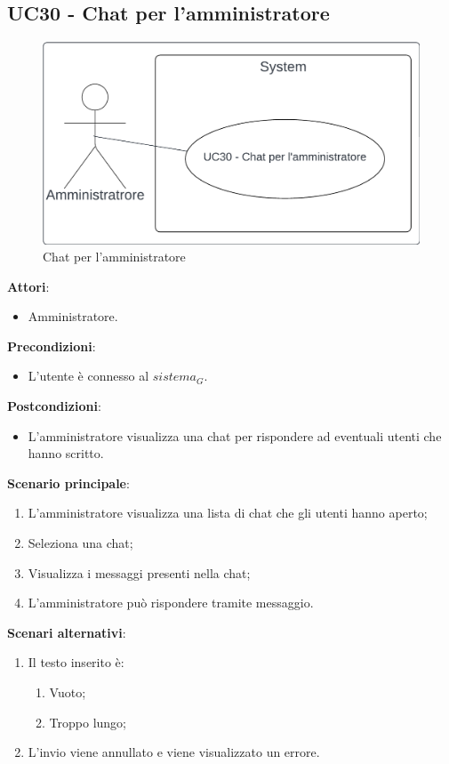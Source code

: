 \subsection{UC30 - Chat per l'amministratore}\label{usecase:30}
\begin{figure}[H]
    \centering
    \includegraphics[width=0.75\linewidth]{ucd/UCD30.png}
    \caption{Chat per l'amministratore}
\end{figure}
\textbf{Attori}:
\begin{itemize}
    \item Amministratore.
\end{itemize}
\textbf{Precondizioni}:
\begin{itemize}
    \item L'utente è connesso al $\textit{sistema}_G$.
\end{itemize}
\textbf{Postcondizioni}:
\begin{itemize}
    \item L'amministratore visualizza una chat per rispondere ad eventuali utenti che hanno scritto.
\end{itemize}
\textbf{Scenario principale}:
\begin{enumerate}
    \item L'amministratore visualizza una lista di chat che gli utenti hanno aperto;
    \item Seleziona una chat;
    \item Visualizza i messaggi presenti nella chat;
    \item L'amministratore può rispondere tramite messaggio.
\end{enumerate}
\textbf{Scenari alternativi}:
\begin{enumerate}
    \item Il testo inserito è:
    \begin{enumerate}
        \item Vuoto;
        \item Troppo lungo;
    \end{enumerate}
    \item L'invio viene annullato e viene visualizzato un errore.
\end{enumerate}